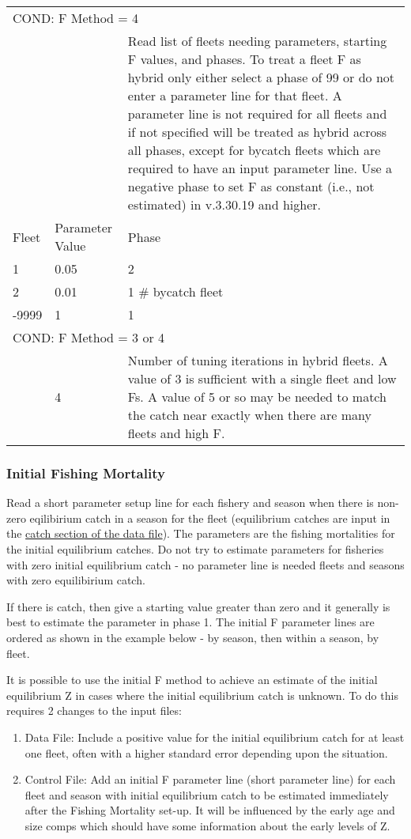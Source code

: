 \begin{longtable}{p{1cm} p{3cm} p{11cm}}
	\multicolumn{3}{l}{COND: F Method = 4} \Tstrut\\
	& & Read list of fleets needing parameters, starting F values, and phases. To treat a fleet F as hybrid only either select a phase of 99 or do not enter a parameter line for that fleet. A parameter line is not required for all fleets and if not specified will be treated as hybrid across all phases, except for bycatch fleets which are required to have an input parameter line. Use a negative phase to set F as constant (i.e., not estimated) in v.3.30.19 and higher. \Tstrut\\
	Fleet & Parameter Value & Phase \Tstrut\\
	1 & 0.05 & 2 \\
	2 & 0.01 & 1 \# bycatch fleet \\
	-9999 & 1 & 1 \Bstrut\\
	\hline
 
	\multicolumn{3}{l}{COND: F Method = 3 or 4} \Tstrut\\
	& 4 & Number of tuning iterations in hybrid fleets. A value of 3 is sufficient with a single fleet and low Fs. A value of 5 or so may be needed to match the catch near exactly when there are many fleets and high F. \Bstrut\\
	\hline
\end{longtable}

\hypertarget{InitF}{}
\subsubsection{Initial Fishing Mortality}
Read a short parameter setup line for each fishery and season when there is non-zero eqilibirium catch in a season for the fleet (equilibrium catches are input in the \hyperlink{CatchFormat}{catch section of the data file}). The parameters are the fishing mortalities for the initial equilibrium catches. Do not try to estimate parameters for fisheries with zero initial equilibrium catch - no parameter line is needed fleets and seasons with zero equilibirium catch.

If there is catch, then give a starting value greater than zero and it generally is best to estimate the parameter in phase 1. The initial F parameter lines are ordered as shown in the example below - by season, then within a season, by fleet.

It is possible to use the initial F method to achieve an estimate of the initial equilibrium Z in cases where the initial equilibrium catch is unknown. To do this requires 2 changes to the input files:
\begin{enumerate}
	\item Data File: Include a positive value for the initial equilibrium catch for at least one fleet, often with a higher standard error depending upon the situation.
	\item Control File: Add an initial F parameter line (short parameter line) for each fleet and season with initial equilibrium catch to be estimated immediately after the Fishing Mortality set-up. It will be influenced by the early age and size comps which should have some information about the early levels of Z.
\end{enumerate}

